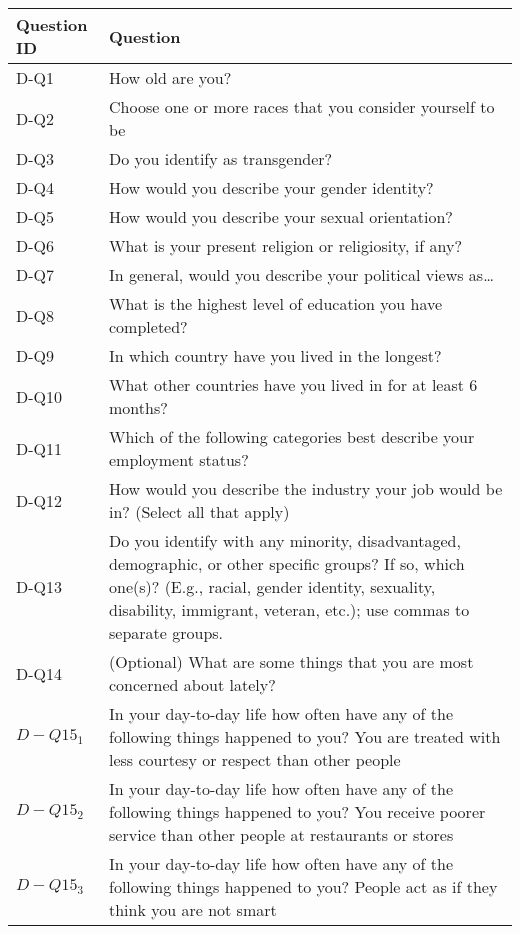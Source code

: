 \begin{table}[!hbpt]
    \footnotesize
    \centering
    \begin{tabularx}{\linewidth}{l|X}
    \toprule
         Question ID & Question  \\
         \midrule
         D-Q1 & How old are you? \\
         D-Q2 & Choose one or more races that you consider yourself to be \\
         D-Q3 & Do you identify as transgender? \\
         D-Q4 & How would you describe your gender identity? \\
         D-Q5 & How would you describe your sexual orientation? \\
         D-Q6 & What is your present religion or religiosity, if any? \\
         D-Q7 & In general, would you describe your political views as… \\
         D-Q8 & What is the highest level of education you have completed? \\
         D-Q9 & In which country have you lived in the longest? \\
         D-Q10 & What other countries have you lived in for at least 6 months? \\
         D-Q11 & Which of the following categories best describe your employment status? \\
         D-Q12 & How would you describe the industry your job would be in? (Select all that apply) \\
         D-Q13 & Do you identify with any minority, disadvantaged, demographic, or other specific groups? If so, which one(s)? (E.g., racial, gender identity, sexuality, disability, immigrant, veteran, etc.); use commas to separate groups. \\
         D-Q14 & (Optional) What are some things that you are most concerned about lately? \\
         $D-Q15_1$ & In your day-to-day life how often have any of the following things happened to you? You are treated with less courtesy or respect than other people \\
         $D-Q15_2$ & In your day-to-day life how often have any of the following things happened to you? You receive poorer service than other people at restaurants or stores \\
         $D-Q15_3$ & In your day-to-day life how often have any of the following things happened to you? People act as if they think you are not smart\\

\end{tabularx}
\end{table}
